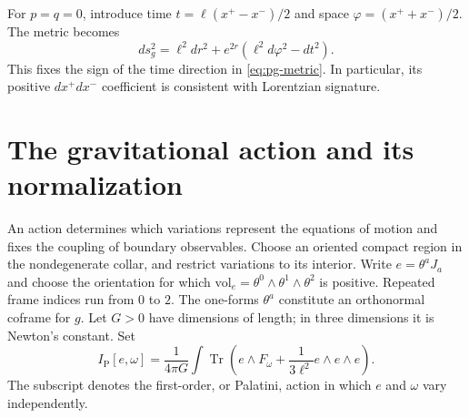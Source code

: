 For $p=q=0$, introduce time $t=\ell(x^+-x^-)/2$ and space $\varphi=(x^++x^-)/2$.
The metric becomes
\[
 ds_g^2=\ell^2dr^2+e^{2r}(\ell^2d\varphi^2-dt^2).
\]
This fixes the sign of the time direction in \eqref{eq:pg-metric}.
In particular, its positive $dx^+dx^-$ coefficient is consistent with Lorentzian signature.

\section{The gravitational action and its normalization}

An action determines which variations represent the equations of motion and fixes the coupling of boundary observables.
Choose an oriented compact region in the nondegenerate collar, and restrict variations to its interior.
Write $e=\theta^aJ_a$ and choose the orientation for which
$\mathrm{vol}_e=\theta^0\wedge\theta^1\wedge\theta^2$ is positive.
Repeated frame indices run from $0$ to $2$.
The one-forms $\theta^a$ constitute an orthonormal coframe for $g$.
Let $G>0$ have dimensions of length; in three dimensions it is Newton's constant.
Set
\[
 I_{\mathrm P}[e,\omega]
 =\frac1{4\pi G}\int\operatorname{Tr}
       \left(e\wedge F_\omega+\frac1{3\ell^2}e\wedge e\wedge e\right).
\]
The subscript denotes the first-order, or Palatini, action in which $e$ and $\omega$ vary independently.

